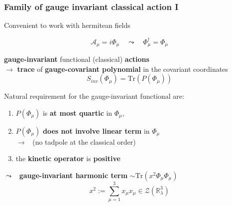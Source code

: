 \documentclass[9pt]{beamer}
\begin{document}
\begin{frame}

\frametitle{Family of gauge invariant classical action I}

Convenient to work with hermitean fields

\begin{equation*}
\mathcal{A}_\mu = i \Phi_\mu \quad \leadsto \quad \Phi_\mu^\dag = \Phi_\mu
\end{equation*}

\textbf{gauge-invariant} functional (classical) \textbf{actions} \\
$\to$ \textbf{trace} of \textbf{gauge-covariant polynomial} in the covariant coordinates
%
\begin{equation*}
S_{inv}(\Phi_\mu) = \mbox{Tr}\left(P(\Phi_\mu)\right) 
\end{equation*}

Natural requirement for the gauge-invariant functional are:

\begin{enumerate}
\item $P(\Phi_\mu)$ is \textbf{at most quartic} in $\Phi_\mu$,
\item $P(\Phi_\mu)$ \textbf{does not involve linear term} in $\Phi_\mu$ \\
$\to$ \ (no tadpole at the classical order)
\item the \textbf{kinetic operator} is \textbf{positive}
\end{enumerate}

\vspace*{10pt}

$\leadsto$ \ \textbf{gauge-invariant harmonic term} $\sim\mbox{Tr}(x^2\Phi_\mu \Phi_\mu)$
\vspace*{-2pt}
\begin{equation*}
x^2 := \sum_{\mu=1}^3x_\mu x_\mu \in \mathcal{Z}(\mathbb{R}^3_\lambda)
\end{equation*}

\end{frame}

\end{document}
